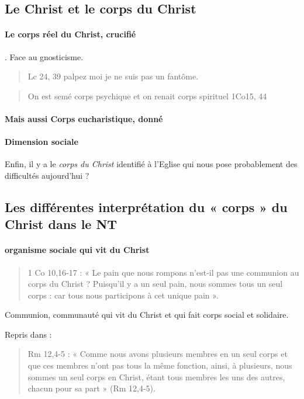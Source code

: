 \subsection{Le Christ et le corps du Christ }
 
\paragraph{Le corps réel du Christ, crucifié}. Face au gnosticisme.
 
 \begin{quote}
     Lc 24, 39 palpez moi je ne suis pas un fantôme. 
 \end{quote}
\begin{quote}
    On est semé corps psychique et on renait corps spirituel 1Co15, 44
\end{quote}

\paragraph{Mais aussi Corps eucharistique, donné}

 
 \paragraph{Dimension sociale}Enfin, il y a le \textit{corps du Christ} identifié à l'Eglise qui nous pose probablement des difficultés aujourd'hui ?
 
 
 
 \subsection{Les différentes interprétation du « corps » du Christ dans le NT}
 
 \paragraph{organisme sociale qui vit du Christ}
\begin{quote}
     1 Co 10,16-17 : « Le pain que nous rompons n’est-il pas une communion au corps du Christ ? Puisqu’il y a un seul pain, nous sommes tous un seul corps : car tous nous participons à cet unique pain ».  
 \end{quote}
 
 Communion, communauté qui vit du Christ et qui fait corps social et solidaire.
 
 Repris dans : 

 
 \begin{quote}
     

Rm 12,4-5 : « Comme nous avons plusieurs membres en un seul corps et que ces membres n’ont pas tous la même fonction, ainsi, à plusieurs, nous sommes un seul corps en Christ, étant tous membres les uns des autres, chacun pour sa part » (Rm 12,4-5).  
 \end{quote}
 
